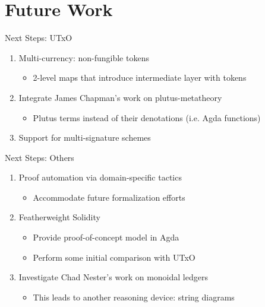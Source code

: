 \documentclass[aspectratio=43]{beamer}
\renewcommand\alert[1]{\textcolor{mLightBrown}{#1}}
\begin{document}
\section{Future Work}

\begin{frame}{Next Steps: UTxO}
\begin{enumerate}
\item Multi-currency: \alert{non-fungible tokens}
  \begin{itemize}
  \item 2-level maps that introduce intermediate layer with tokens
  \end{itemize}
\item Integrate James Chapman's work on \alert{plutus-metatheory}
  \begin{itemize}
  \item Plutus terms instead of their denotations (i.e. Agda functions)
  \end{itemize}
\item Support for \alert{multi-signature} schemes
\end{enumerate}
\end{frame}

\begin{frame}{Next Steps: Others}
\begin{enumerate}
\item Proof automation via domain-specific tactics
   \begin{itemize}
   \item Accommodate future formalization efforts
   \end{itemize}
\item Featherweight Solidity
  \begin{itemize}
  \item Provide proof-of-concept model in Agda
  \item Perform some initial comparison with UTxO
  \end{itemize}
\item Investigate Chad Nester's work on \alert{monoidal ledgers}
  \begin{itemize}
  \item This leads to another reasoning device: \alert{string diagrams}
  \end{itemize}
\end{enumerate}
\end{frame}
\end{document}
